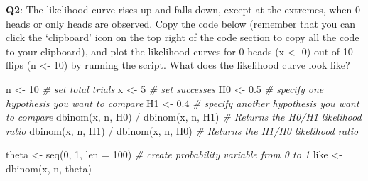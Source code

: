 \documentclass[
  oneside]{krantz}
\makeatletter
\newenvironment{Shaded}{\begin{snugshade}}{\end{snugshade}}
\newcommand{\AttributeTok}[1]{\textcolor[rgb]{0.61,0.61,0.61}{#1}}
\newcommand{\CommentTok}[1]{\textcolor[rgb]{0.37,0.37,0.37}{\textit{#1}}}
\newcommand{\DecValTok}[1]{\textcolor[rgb]{0.06,0.06,0.06}{#1}}
\newcommand{\FloatTok}[1]{\textcolor[rgb]{0.06,0.06,0.06}{#1}}
\newcommand{\FunctionTok}[1]{\textcolor[rgb]{0,0,0}{#1}}
\newcommand{\NormalTok}[1]{#1}
\newcommand{\OtherTok}[1]{\textcolor[rgb]{0.37,0.37,0.37}{#1}}
\newcommand{\SpecialCharTok}[1]{\textcolor[rgb]{0,0,0}{#1}}
\newenvironment{kframe}{%
\medskip{}
\setlength{\fboxsep}{.8em}
 \def\at@end@of@kframe{}%
 \ifinner\ifhmode%
  \def\at@end@of@kframe{\end{minipage}}%
  \begin{minipage}{\columnwidth}%
 \fi\fi%
 \def\FrameCommand##1{\hskip\@totalleftmargin \hskip-\fboxsep
 \colorbox{shadecolor}{##1}\hskip-\fboxsep
     \hskip-\linewidth \hskip-\@totalleftmargin \hskip\columnwidth}%
 \MakeFramed {\advance\hsize-\width
   \@totalleftmargin\z@ \linewidth\hsize
   \@setminipage}}%
 {\par\unskip\endMakeFramed%
 \at@end@of@kframe}
\renewenvironment{Shaded}{\begin{kframe}}{\end{kframe}}
\makeatother
\begin{document}
\textbf{Q2}: The likelihood curve rises up and falls down, except at the extremes, when 0 heads or only heads are observed. Copy the code below (remember that you can click the `clipboard' icon on the top right of the code section to copy all the code to your clipboard), and plot the likelihood curves for 0 heads (x \textless- 0) out of 10 flips (n \textless- 10) by running the script. What does the likelihood curve look like?

\begin{Shaded}
\begin{Highlighting}[]
\NormalTok{n }\OtherTok{\textless{}{-}} \DecValTok{10} \CommentTok{\# set total trials}
\NormalTok{x }\OtherTok{\textless{}{-}} \DecValTok{5} \CommentTok{\# set successes}
\NormalTok{H0 }\OtherTok{\textless{}{-}} \FloatTok{0.5} \CommentTok{\# specify one hypothesis you want to compare}
\NormalTok{H1 }\OtherTok{\textless{}{-}} \FloatTok{0.4} \CommentTok{\# specify another hypothesis you want to compare}
\FunctionTok{dbinom}\NormalTok{(x, n, H0) }\SpecialCharTok{/} \FunctionTok{dbinom}\NormalTok{(x, n, H1) }\CommentTok{\# Returns the H0/H1 likelihood ratio}
\FunctionTok{dbinom}\NormalTok{(x, n, H1) }\SpecialCharTok{/} \FunctionTok{dbinom}\NormalTok{(x, n, H0) }\CommentTok{\# Returns the H1/H0 likelihood ratio}

\NormalTok{theta }\OtherTok{\textless{}{-}} \FunctionTok{seq}\NormalTok{(}\DecValTok{0}\NormalTok{, }\DecValTok{1}\NormalTok{, }\AttributeTok{len =} \DecValTok{100}\NormalTok{) }\CommentTok{\# create probability variable from 0 to 1}
\NormalTok{like }\OtherTok{\textless{}{-}} \FunctionTok{dbinom}\NormalTok{(x, n, theta)}


\end{Highlighting}
\end{Shaded}
\end{document}
